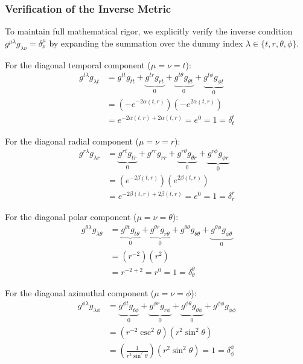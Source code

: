 \documentclass[11pt, a4paper]{report}
\begin{document}
\subsubsection*{Verification of the Inverse Metric}
To maintain full mathematical rigor, we explicitly verify the inverse condition $g^{\mu\lambda} g_{\lambda\nu} = \delta^\mu_\nu$ by expanding the summation over the dummy index $\lambda \in \{t, r, \theta, \phi\}$.

For the diagonal temporal component ($\mu = \nu = t$):
\begin{align}
    g^{t\lambda} g_{\lambda t} &= g^{tt} g_{tt} + \underbrace{g^{tr} g_{rt}}_{0} + \underbrace{g^{t\theta} g_{\theta t}}_{0} + \underbrace{g^{t\phi} g_{\phi t}}_{0} \nonumber \\
    &= \left( -e^{-2\alpha(t,r)} \right) \left( -e^{2\alpha(t,r)} \right) \nonumber \\
    &= e^{-2\alpha(t,r) + 2\alpha(t,r)} = e^0 = 1 = \delta^t_t
\end{align}

For the diagonal radial component ($\mu = \nu = r$):
\begin{align}
    g^{r\lambda} g_{\lambda r} &= \underbrace{g^{rt} g_{tr}}_{0} + g^{rr} g_{rr} + \underbrace{g^{r\theta} g_{\theta r}}_{0} + \underbrace{g^{r\phi} g_{\phi r}}_{0} \nonumber \\
    &= \left( e^{-2\beta(t,r)} \right) \left( e^{2\beta(t,r)} \right) \nonumber \\
    &= e^{-2\beta(t,r) + 2\beta(t,r)} = e^0 = 1 = \delta^r_r
\end{align}

For the diagonal polar component ($\mu = \nu = \theta$):
\begin{align}
    g^{\theta\lambda} g_{\lambda \theta} &= \underbrace{g^{\theta t} g_{t \theta}}_{0} + \underbrace{g^{\theta r} g_{r \theta}}_{0} + g^{\theta\theta} g_{\theta\theta} + \underbrace{g^{\theta\phi} g_{\phi \theta}}_{0} \nonumber \\
    &= \left( r^{-2} \right) \left( r^2 \right) \nonumber \\
    &= r^{-2+2} = r^0 = 1 = \delta^\theta_\theta
\end{align}

For the diagonal azimuthal component ($\mu = \nu = \phi$):
\begin{align}
    g^{\phi\lambda} g_{\lambda \phi} &= \underbrace{g^{\phi t} g_{t \phi}}_{0} + \underbrace{g^{\phi r} g_{r \phi}}_{0} + \underbrace{g^{\phi\theta} g_{\theta \phi}}_{0} + g^{\phi\phi} g_{\phi\phi} \nonumber \\
    &= \left( r^{-2} \csc^2\theta \right) \left( r^2 \sin^2\theta \right) \nonumber \\
    &= \left( \frac{1}{r^2 \sin^2\theta} \right) \left( r^2 \sin^2\theta \right) = 1 = \delta^\phi_\phi
\end{align}
\end{document}
